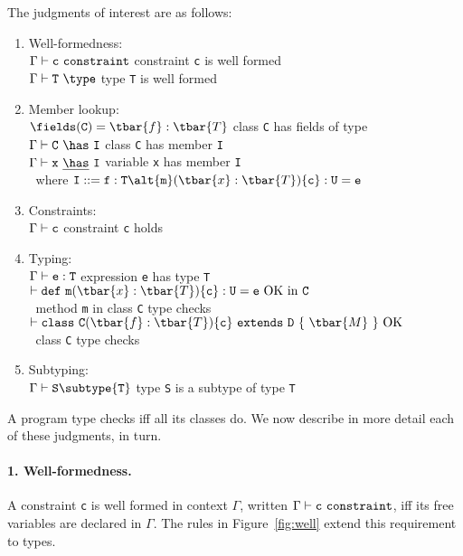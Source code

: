 The judgments of interest are as follows:
\begin{enumerate}
	\item Well-formedness:\\
	  $\cj{\Gamma}{\tt c}$ \hfill constraint {\tt c} is well formed\\
	  $\wj{\Gamma}{\tt T}$ \hfill  type {\tt T} is well formed
	\item Member lookup:\\
	  $\fields({\tt C})=\tbar{f}:\tbar{T}$ \hfill class {\tt C} has fields  of type \\
	  $\Gamma\vdash {\tt C}~\has~{\tt I}$ \hfill class {\tt C} has member {\tt I}\\
	  $\Gamma\vdash {\tt x}~\underline\has~{\tt I}$ \hfill variable {\tt x} has member {\tt I}\\
	  $~$ \hfill where ${\tt I}::= {\tt f}:{\tt T} \alt {\tt m}(\tbar{x}:\tbar{T})\{{\tt c}\}:{\tt U}={\tt e}$
	\item Constraints:\\
	  $\Gamma\vdash {\tt c}$ \hfill constraint {\tt c} holds
	\item Typing:\\
	  $\Gamma\vdash {\tt e}:{\tt T}$ \hfill expression {\tt e} has type {\tt T}\\
	  $\vdash {\tt def}~{\tt m}(\tbar{x}:\tbar{T})\{{\tt c}\}:{\tt U}={\tt e}~{\rm OK~in}~{\tt C}$ \\ $~$ \hfill method {\tt m} in class {\tt C} type checks\\
	  $\vdash {\tt class}~{\tt C}(\tbar{f}:\tbar{T})\{{\tt c}\}~{\tt extends}~{\tt D}~\{~\tbar{M}~\}~{\rm OK}$ \\ $~$ \hfill class {\tt C} type checks
	\item Subtyping:\\
	  $\Gamma \vdash {\tt S} \subtype {\tt T}$ \hfill type {\tt S} is a subtype of type {\tt T}
\end{enumerate}

\medskip

A program type checks iff all its classes do.  We now describe
in more detail each of these judgments, in turn.

\paragraph{1. Well-formedness.} A constraint {\tt c} is well formed in context $\Gamma$, written $\cj{\Gamma}{\tt c}$, iff its free variables are declared in $\Gamma$. The rules in Figure~\ref{fig:well} extend this requirement to types.

